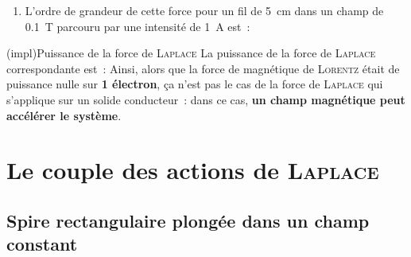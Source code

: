 \documentclass[../../main/main.tex]{subfiles}
\begin{document}
\begin{tcb}
\begin{minipage}[t]{.30\linewidth}
\begin{center}
			\label{fig:ra_lpl}
		\end{center}
	\end{minipage}
	\begin{enumerate}[start=3]
		\item L'ordre de grandeur de cette force pour un fil de \SI{5}{cm} dans un
		      champ de \SI{0.1}{T} parcouru par une intensité de \SI{1}{A} est~:
		      \psw{%
			      \[
				      \boxed{\norm{\vv{F_{\textsc{Laplace}}}} = i \ell B = \SI{5}{mN}}
			      \]
		      }%
		      \vspace{-15pt}
	\end{enumerate}
\end{tcb}

\begin{tcb*}[sidebyside](impl){Puissance de la force de \textsc{Laplace}}
	La puissance de la force de \textsc{Laplace} correspondante est~:
	\psw{%
		\[
			\boxed{
				\Pc_{L,v}
				= \left( i \vv{L}\wedge \vv{B} \right) \cdot \vv{v}}
		\]
	}%
	\tcblower
	Ainsi, alors que la force de magnétique de \textsc{Lorentz} était de
	puissance nulle sur \textbf{1 électron}, ça n'est pas le cas de la force
	de \textsc{Laplace} qui s'applique sur un solide conducteur~: dans ce
	cas, \textbf{un champ magnétique peut accélérer le système}.
\end{tcb*}

\section{Le couple des actions de \textsc{Laplace}}
\label{sec:lplcpl}

\subsection{Spire rectangulaire plongée dans un champ constant}
\label{ssec:lplcplspire}
\end{document}
